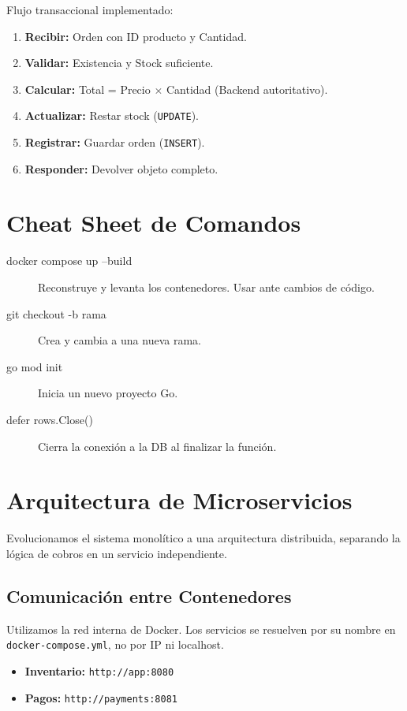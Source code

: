 \documentclass[a4paper,12pt]{article}
\begin{document}
Flujo transaccional implementado:
\begin{enumerate}
    \item \textbf{Recibir:} Orden con ID producto y Cantidad.
    \item \textbf{Validar:} Existencia y Stock suficiente.
    \item \textbf{Calcular:} Total = Precio $\times$ Cantidad (Backend autoritativo).
    \item \textbf{Actualizar:} Restar stock (\texttt{UPDATE}).
    \item \textbf{Registrar:} Guardar orden (\texttt{INSERT}).
    \item \textbf{Responder:} Devolver objeto completo.
\end{enumerate}

\section{Cheat Sheet de Comandos}

\begin{description}
    \item[docker compose up --build] Reconstruye y levanta los contenedores. Usar ante cambios de código.
    \item[git checkout -b rama] Crea y cambia a una nueva rama.
    \item[go mod init] Inicia un nuevo proyecto Go.
    \item[defer rows.Close()] Cierra la conexión a la DB al finalizar la función.
\end{description}




\newpage
\section{Arquitectura de Microservicios}

Evolucionamos el sistema monolítico a una arquitectura distribuida, separando la lógica de cobros en un servicio independiente.

\subsection{Comunicación entre Contenedores}
Utilizamos la red interna de Docker. Los servicios se resuelven por su nombre en \texttt{docker-compose.yml}, no por IP ni localhost.

\begin{itemize}
    \item \textbf{Inventario:} \texttt{http://app:8080}
    \item \textbf{Pagos:} \texttt{http://payments:8081}
\end{itemize}
\end{document}

